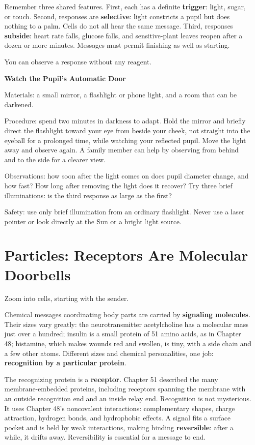 Remember three shared features. First, each has a definite \textbf{trigger}: light, sugar, or touch. Second, responses are \textbf{selective}: light constricts a pupil but does nothing to a palm. Cells do not all hear the same message. Third, responses \textbf{subside}: heart rate falls, glucose falls, and sensitive-plant leaves reopen after a dozen or more minutes. Messages must permit finishing as well as starting.

You can observe a response without any reagent.

\begin{shiyan}
\textbf{Watch the Pupil's Automatic Door}

Materials: a small mirror, a flashlight or phone light, and a room that can be darkened.

Procedure: spend two minutes in darkness to adapt. Hold the mirror and briefly direct the flashlight toward your eye from beside your cheek, not straight into the eyeball for a prolonged time, while watching your reflected pupil. Move the light away and observe again. A family member can help by observing from behind and to the side for a clearer view.

Observations: how soon after the light comes on does pupil diameter change, and how fast? How long after removing the light does it recover? Try three brief illuminations: is the third response as large as the first?

Safety: use only brief illumination from an ordinary flashlight. Never use a laser pointer or look directly at the Sun or a bright light source.
\end{shiyan}

\section{Particles: Receptors Are Molecular Doorbells}

Zoom into cells, starting with the sender.

Chemical messages coordinating body parts are carried by \textbf{signaling molecules}. Their sizes vary greatly: the neurotransmitter acetylcholine has a molecular mass just over a hundred; insulin is a small protein of 51 amino acids, as in Chapter 48; histamine, which makes wounds red and swollen, is tiny, with a side chain and a few other atoms. Different sizes and chemical personalities, one job: \textbf{recognition by a particular protein}.

The recognizing protein is a \textbf{receptor}. Chapter 51 described the many membrane-embedded proteins, including receptors spanning the membrane with an outside recognition end and an inside relay end. Recognition is not mysterious. It uses Chapter 48's noncovalent interactions: complementary shapes, charge attraction, hydrogen bonds, and hydrophobic effects. A signal fits a surface pocket and is held by weak interactions, making binding \textbf{reversible}: after a while, it drifts away. Reversibility is essential for a message to end.

